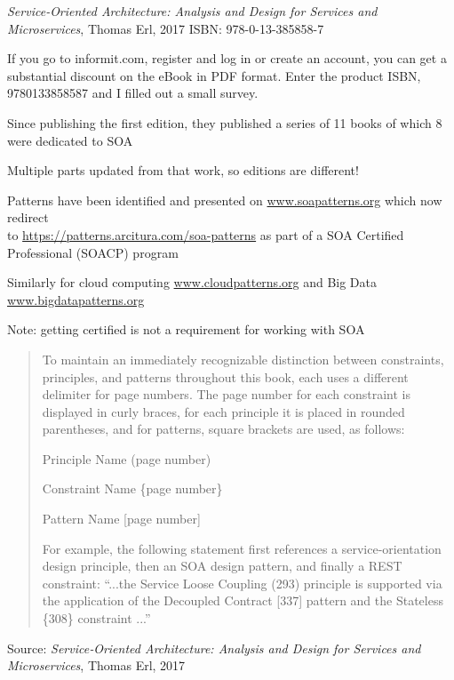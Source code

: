 \documentclass[Screen16to9,17pt]{foils}
\begin{document}



\emph{Service‑Oriented Architecture: Analysis and Design for Services and Microservices}, Thomas Erl, 2017
ISBN: 978-0-13-385858-7

If you go to informit.com,
register and log in or create an account, you can get a substantial discount on the eBook in PDF format. Enter the product ISBN, 9780133858587 and I filled out a small survey.



\begin{list2}
\item Since publishing the first edition, they published a series of 11 books of which 8 were dedicated to SOA
\item Multiple parts updated from that work, so editions are different!
\item Patterns have been identified and presented on \url{www.soapatterns.org} which now redirect\\
 to \url{https://patterns.arcitura.com/soa-patterns} as part of
a SOA Certified Professional (SOACP) program
\item Similarly for cloud computing \url{www.cloudpatterns.org} and Big
Data \url{www.bigdatapatterns.org}
\item Note: getting certified is not a requirement for working with SOA
\end{list2}




\begin{quote}
To maintain an immediately recognizable distinction between constraints, principles, and patterns throughout this book, each uses a different delimiter for page numbers. The page number for each constraint is displayed in curly braces, for each principle it is placed in rounded parentheses, and for patterns, square brackets are used, as follows:

\begin{list2}
\item Principle Name (page number)
\item Constraint Name \{page number\}
\item Pattern Name [page number]
\end{list2}
For example, the following statement first references a service-orientation design principle, then an SOA design pattern, and finally a REST constraint:
“...the Service Loose Coupling (293) principle is supported via the application of the Decoupled
Contract [337] pattern and the Stateless \{308\} constraint ...”
\end{quote}
Source: \emph{Service‑Oriented Architecture: Analysis and Design for Services and Microservices}, Thomas Erl, 2017
\end{document}
